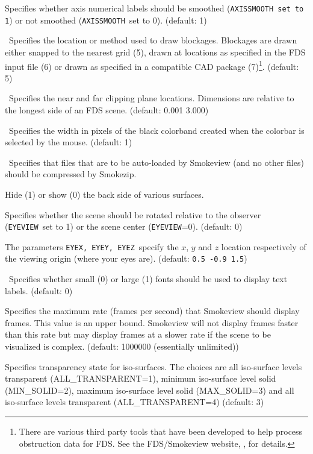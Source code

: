 \documentclass[11pt,twoside]{book}
\newcommand{\hitem}[1]{\item[{\bf #1} \hfill]}
\newcommand{\hitemNULL}[1]{}
\begin{document}
\hitem{AXISSMOOTH}Specifies
whether axis  numerical labels should be smoothed
({\tt AXISSMOOTH set to 1}) or not smoothed ({\tt AXISSMOOTH}\ set to 0).
(default: 1)

\hitem{BLOCKLOCATION}\ Specifies the location or method used to
draw blockages.  Blockages are drawn either snapped to the nearest
grid (5), drawn at locations as specified in the FDS input file
(6) or drawn as specified in a compatible CAD package (7)\footnote{There are various
third party tools that have been developed to help process obstruction data for FDS. See
the FDS/Smokeview website, , for details.}.   (default: 5)

\hitemNULL{BOUNDARYTWOSIDE}

\hitem{CLIP}\ Specifies the near and far clipping plane
locations.  Dimensions are relative to the longest side of
an FDS scene. (default: 0.001 3.000)

\hitemNULL{CONTOURTYPE}

\hitem{COLORBAND}\ Specifies the width in pixels of the black colorband created when the
colorbar is selected by the mouse.  (default: 1)

\hitem{COMPRESSAUTO}\ Specifies that files that are to be auto-loaded
by Smokeview (and no other files) should be compressed by Smokezip.

\hitem{CULLFACES}Hide (1) or show (0) the back side of various surfaces.

\hitem{EYEVIEW}Specifies whether
the scene should be rotated relative to the observer ({\tt EYEVIEW}\ set to 1)
or the scene center ({\tt EYEVIEW}=0).
(default: 0)

\hitem{EYEX, EYEY, EYEZ}The parameters {\tt EYEX, EYEY, EYEZ}\ specify the
$x$, $y$ and $z$ location respectively of the viewing origin (where your eyes are).
(default: {\tt 0.5 -0.9 1.5})

\hitem{FONTSIZE}\ Specifies whether small (0) or large (1)
fonts should be used to display text labels. (default: 0)

\hitem{FRAMERATEVALUE}Specifies the maximum rate (frames per
second) that Smokeview should display frames. This value is an
upper bound.  Smokeview will not display frames faster than this
rate but may display frames at a slower rate if the scene to be
visualized is complex. (default: 1000000 (essentially unlimited))

\hitem{ISOTRANS}Specifies transparency state for iso-surfaces. The choices
are all iso-surface levels transparent (ALL\_TRANSPARENT=1), minimum
iso-surface level solid (MIN\_SOLID=2), maximum iso-surface level solid (MAX\_SOLID=3)
and all iso-surface levels transparent (ALL\_TRANSPARENT=4) (default: 3)
\end{document}
